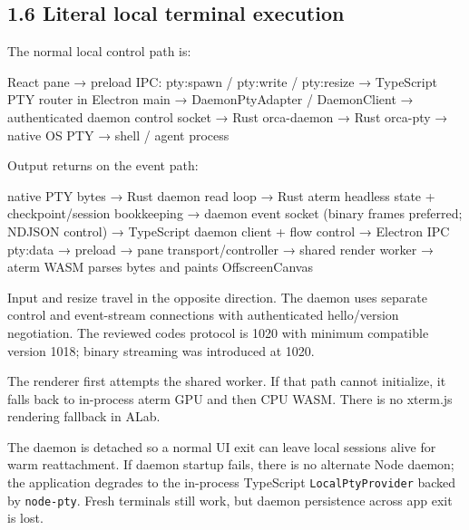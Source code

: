 \documentclass[
  10pt,
  letterpaper,
]{article}
\newenvironment{Shaded}{\begin{snugshade}}{\end{snugshade}}
\newcommand{\NormalTok}[1]{#1}
\begin{document}
\subsection{1.6 Literal local terminal
execution}\label{16-literal-local-terminal-execution}

The normal local control path is:

\begin{Shaded}
\begin{Highlighting}[]
\NormalTok{React pane}
\NormalTok{  → preload IPC: pty:spawn / pty:write / pty:resize}
\NormalTok{  → TypeScript PTY router in Electron main}
\NormalTok{  → DaemonPtyAdapter / DaemonClient}
\NormalTok{  → authenticated daemon control socket}
\NormalTok{  → Rust orca{-}daemon}
\NormalTok{  → Rust orca{-}pty}
\NormalTok{  → native OS PTY}
\NormalTok{  → shell / agent process}
\end{Highlighting}
\end{Shaded}

Output returns on the event path:

\begin{Shaded}
\begin{Highlighting}[]
\NormalTok{native PTY bytes}
\NormalTok{  → Rust daemon read loop}
\NormalTok{  → Rust aterm headless state + checkpoint/session bookkeeping}
\NormalTok{  → daemon event socket (binary frames preferred; NDJSON control)}
\NormalTok{  → TypeScript daemon client + flow control}
\NormalTok{  → Electron IPC pty:data}
\NormalTok{  → preload}
\NormalTok{  → pane transport/controller}
\NormalTok{  → shared render worker}
\NormalTok{  → aterm WASM parses bytes and paints OffscreenCanvas}
\end{Highlighting}
\end{Shaded}

Input and resize travel in the opposite direction. The daemon uses
separate control and event-stream connections with authenticated
hello/version negotiation. The reviewed code\textquotesingle s protocol
is 1020 with minimum compatible version 1018; binary streaming was
introduced at 1020.

The renderer first attempts the shared worker. If that path cannot
initialize, it falls back to in-process aterm GPU and then CPU WASM.
There is no xterm.js rendering fallback in ALab.

The daemon is detached so a normal UI exit can leave local sessions
alive for warm reattachment. If daemon startup fails, there is no
alternate Node daemon; the application degrades to the in-process
TypeScript \texttt{LocalPtyProvider} backed by \texttt{node-pty}. Fresh
terminals still work, but daemon persistence across app exit is lost.
\end{document}

